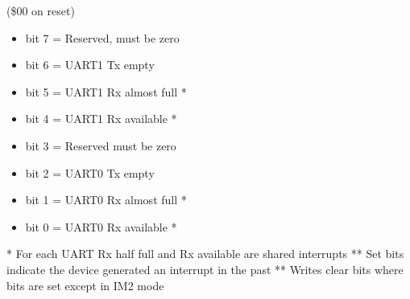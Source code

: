 (\$00 on reset)
\begin{itemize}
\item bit 7 = Reserved, must be zero
\item bit 6 = UART1 Tx empty
\item bit 5 = UART1 Rx almost full *
\item bit 4 = UART1 Rx available *
\item bit 3 = Reserved must be zero
\item bit 2 = UART0 Tx empty
\item bit 1 = UART0 Rx almost full *
\item bit 0 = UART0 Rx available *
\end{itemize}
* For each UART Rx half full and Rx available are shared interrupts
** Set bits indicate the device generated an interrupt in the past
** Writes clear bits where bits are set except in IM2 mode



